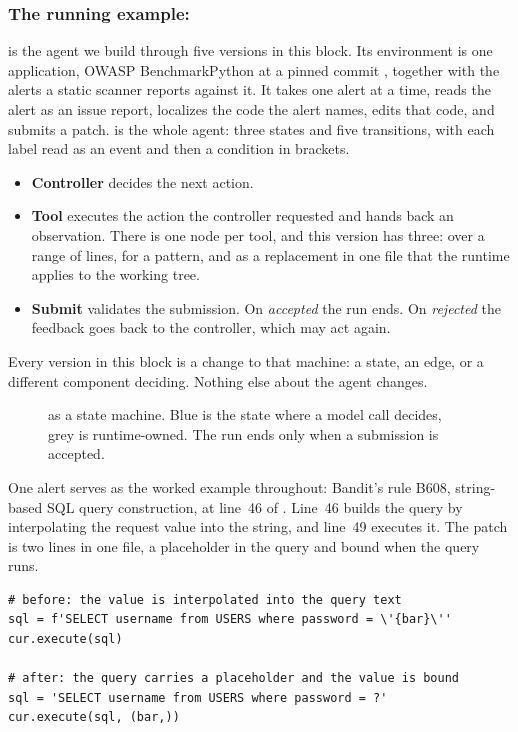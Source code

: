 \subsubsection{The running example: \msa{}}
\msa{} is the agent we build through five versions in this block. Its environment is one
application, OWASP BenchmarkPython at a pinned commit \citep{owasp-benchmarkpython}, together
with the alerts a static scanner reports against it. It takes one alert at a time, reads the
alert as an issue report, localizes the code the alert names, edits that code, and submits a
patch.  is the whole agent: three states and five transitions, with each
label read as an event and then a condition in brackets.
\begin{itemize}
  \item \textbf{Controller} decides the next action.
  \item \textbf{Tool} executes the action the controller requested and hands back an
  observation. There is one node per tool, and this version has three:  over
  a range of lines,  for a pattern, and  as a replacement in one
  file that the runtime applies to the working tree.
  \item \textbf{Submit} validates the submission. On \emph{accepted} the run ends. On
  \emph{rejected} the feedback goes back to the controller, which may act again.
\end{itemize}
Every version in this block is a change to that machine: a state, an edge, or a different
component deciding. Nothing else about the agent changes.

\begin{figure}[htbp]
  \centering
  \resizebox{\linewidth}{!}{}
  \caption{\msa{} as a state machine. Blue is the state where a model call decides, grey is
  runtime-owned. The run ends only when a submission is accepted.}
  \label{fig:agents-state}
\end{figure}

One alert serves as the worked example throughout: Bandit's rule B608, string-based SQL query
construction, at line~46 of . Line~46 builds the query by
interpolating the request value  into the string, and line~49 executes it. The
patch is two lines in one file, a placeholder in the query and  bound when the
query runs.

\begin{lstlisting}[caption={The worked alert, before and after. Two lines in one file.},label=lst:agents-patch]
# before: the value is interpolated into the query text
sql = f'SELECT username from USERS where password = \'{bar}\''
cur.execute(sql)

# after: the query carries a placeholder and the value is bound
sql = 'SELECT username from USERS where password = ?'
cur.execute(sql, (bar,))
\end{lstlisting}

